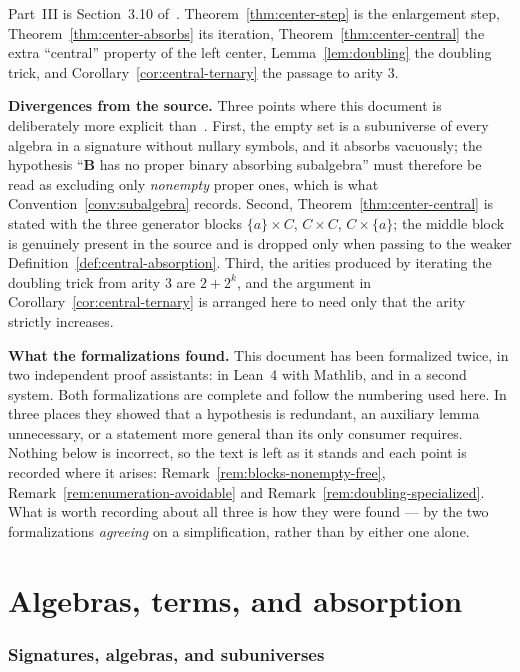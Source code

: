 \documentclass[11pt]{article}
\theoremstyle{mainplain}
\theoremstyle{mainroman}
\theoremstyle{definition}
\numberwithin{equation}{section}
\newcommand{\bB}{\mathbf B}
\begin{document}
Part~III is Section~3.10 of~\cite{BradyNotes}. Theorem~\ref{thm:center-step} is
the enlargement step, Theorem~\ref{thm:center-absorbs} its iteration,
Theorem~\ref{thm:center-central} the extra ``central'' property of the left
center, Lemma~\ref{lem:doubling} the doubling trick, and
Corollary~\ref{cor:central-ternary} the passage to arity $3$.

\medskip

\noindent\textbf{Divergences from the source.} Three points where this document
is deliberately more explicit than~\cite{BradyNotes}. First, the empty set is a
subuniverse of every algebra in a signature without nullary symbols, and it
absorbs vacuously; the hypothesis ``$\bB$ has no proper binary absorbing
subalgebra'' must therefore be read as excluding only \emph{nonempty} proper
ones, which is what Convention~\ref{conv:subalgebra} records. Second,
Theorem~\ref{thm:center-central} is stated with the three generator blocks
$\{a\}\times C$, $C\times C$, $C\times\{a\}$; the middle block is genuinely
present in the source and is dropped only when passing to the weaker
Definition~\ref{def:central-absorption}. Third, the arities produced by
iterating the doubling trick from arity $3$ are $2+2^{k}$, and the argument in
Corollary~\ref{cor:central-ternary} is arranged here to need only that the
arity strictly increases.

\medskip

\noindent\textbf{What the formalizations found.} This document has been
formalized twice, in two independent proof assistants: in Lean~4 with Mathlib,
and in a second system. Both formalizations are complete and follow the
numbering used here. In three places they showed that a hypothesis is
redundant, an auxiliary lemma unnecessary, or a statement more general than its
only consumer requires. Nothing below is incorrect, so the text is left as it
stands and each point is recorded where it arises:
Remark~\ref{rem:blocks-nonempty-free},
Remark~\ref{rem:enumeration-avoidable} and
Remark~\ref{rem:doubling-specialized}. What is worth recording about all three
is how they were found --- by the two formalizations \emph{agreeing} on a
simplification, rather than by either one alone.

\part{Algebras, terms, and absorption}
\label{part:algebras}

\section{Signatures, algebras, and subuniverses}\label{sec:algebras}
\end{document}

